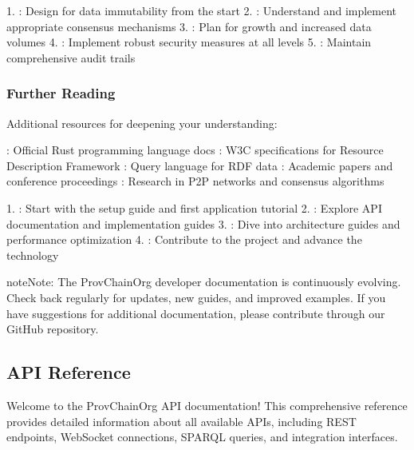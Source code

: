 \documentclass[letterpaper,10pt,english]{sphinxmanual}
\begin{document}
\sphinxAtStartPar
{}
1. : Design for data immutability from the start
2. : Understand and implement appropriate consensus mechanisms
3. : Plan for growth and increased data volumes
4. : Implement robust security measures at all levels
5. : Maintain comprehensive audit trails


\subsubsection{Further Reading}
\label{\detokenize{developer/index:further-reading}}
\sphinxAtStartPar
Additional resources for deepening your understanding:

\sphinxAtStartPar
{}
\sphinxhyphen{} : Official Rust programming language docs
\sphinxhyphen{} : W3C specifications for Resource Description Framework
\sphinxhyphen{} : Query language for RDF data
\sphinxhyphen{} : Academic papers and conference proceedings
\sphinxhyphen{} : Research in P2P networks and consensus algorithms

\sphinxAtStartPar
{}
1. : Start with the setup guide and first application tutorial
2. : Explore API documentation and implementation guides
3. : Dive into architecture guides and performance optimization
4. : Contribute to the project and advance the technology

\begin{sphinxadmonition}{note}{Note:}
\sphinxAtStartPar
The ProvChainOrg developer documentation is continuously evolving. Check back regularly for updates, new guides, and improved examples. If you have suggestions for additional documentation, please contribute through our GitHub repository.
\end{sphinxadmonition}



\sphinxstepscope


\subsection{API Reference}
\label{\detokenize{api/index:api-reference}}\label{\detokenize{api/index::doc}}
\sphinxAtStartPar
Welcome to the ProvChainOrg API documentation! This comprehensive reference provides detailed information about all available APIs, including REST endpoints, WebSocket connections, SPARQL queries, and integration interfaces.
\end{document}
